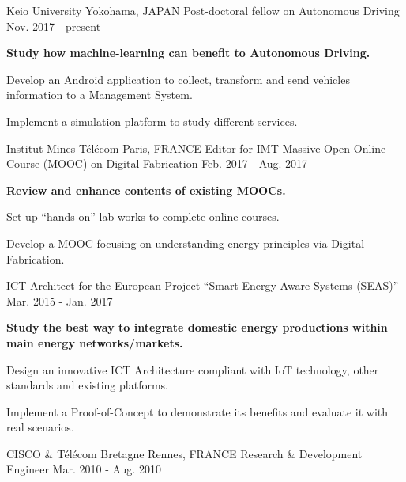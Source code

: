 \begin{cventries}
  \cventry
    {Keio University}
    {Yokohama, JAPAN}
    {Post-doctoral fellow on Autonomous Driving}
    {Nov. 2017 - present}
    {
      \begin{cvitems}
        \item {\textbf{Study how machine-learning can benefit to Autonomous Driving.}}
        \item {Develop an Android application to collect, transform and send vehicles information to a Management System.}
        \item {Implement a simulation platform to study different services.}
      \end{cvitems}
    }
  \cventry
    {Institut Mines-T\'{e}l\'{e}com}
    {Paris, FRANCE}
    {Editor for IMT Massive Open Online Course (MOOC) on Digital Fabrication }
    {Feb. 2017 - Aug. 2017}
    {
      \begin{cvitems}
        \item {\textbf{Review and enhance contents of existing MOOCs.}}
        \item {Set up ``hands-on'' lab works to complete online courses.}
        \item {Develop a MOOC focusing on understanding energy principles via Digital Fabrication.}
      \end{cvitems}
    }
  \cventry
    { }
    { }
    {\hspace*{0,7cm} ICT Architect for the European Project ``Smart Energy Aware Systems (SEAS)''}
    {Mar. 2015 - Jan. 2017}
    {
      \begin{cvitems}
      	\item {\textbf{Study the best way to integrate domestic energy productions within main energy networks/markets.}}
        \item {Design an innovative ICT Architecture compliant with IoT technology, other standards and existing platforms.}
        \item {Implement a Proof-of-Concept to demonstrate its benefits and evaluate it with real scenarios.}
      \end{cvitems}
    }
  \cventry
    {CISCO \& T\'{e}l\'{e}com Bretagne}
    {Rennes, FRANCE}
    {Research \& Development Engineer}
    {Mar. 2010 - Aug. 2010}
    {
      \begin{cvitems}

\end{cvitems}}
\end{cventries}
